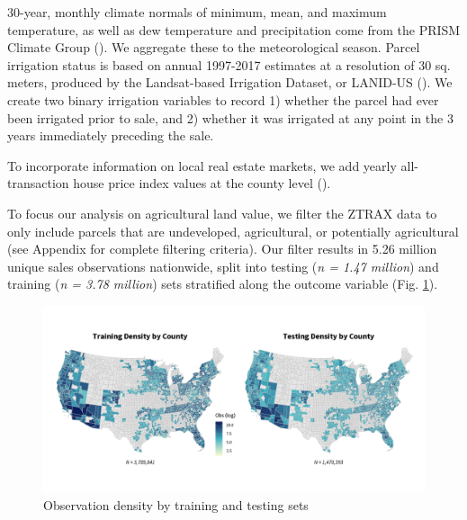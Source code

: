 \documentclass[12pt]{article}
\begin{document}
30-year, monthly climate normals of minimum, mean, and maximum temperature, as well as dew temperature and precipitation come from the PRISM Climate Group (\cite{PRISMClimate2021}). We aggregate these to the meteorological season. Parcel irrigation status is based on annual 1997-2017 estimates at a resolution of 30 sq. meters, produced by the Landsat-based Irrigation Dataset, or LANID-US (\cite{Xie2021MappingStates}). We create two binary irrigation variables to record 1) whether the parcel had ever been irrigated prior to sale, and 2) whether it was irrigated at any point in the 3 years immediately preceding the sale. 

To incorporate information on local real estate markets, we add yearly all-transaction house price index values at the county level (\cite{FederalHousing2022}).

To focus our analysis on agricultural land value, we filter the ZTRAX data to only include parcels that are undeveloped, agricultural, or potentially agricultural (see Appendix for complete filtering criteria).
Our filter results in 5.26 million unique sales observations nationwide, split into testing (\textit{n = 1.47 million}) and training (\textit{n = 3.78 million}) sets stratified along the outcome variable (Fig. \ref{fig:train_test}). 

\begin{figure}
    \centering
    \includegraphics[width=6in]{archive/figures/test_train_density.png}
    \caption{Observation density by training and testing sets}
    \label{fig:train_test}
\end{figure}
\end{document}
